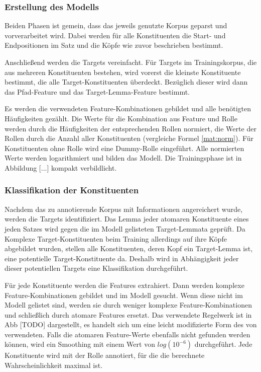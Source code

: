 \documentclass[12pt]{article}
\begin{document}
\subsubsection*{Erstellung des Modells}

Beiden Phasen ist gemein, dass das jeweils genutzte Korpus geparst und vorverarbeitet wird. Dabei werden für alle Konstituenten die Start- und Endpositionen im Satz und die Köpfe wie zuvor beschrieben bestimmt.

Anschließend werden die Targets vereinfacht. Für Targets im Trainingskorpus, die aus mehreren Konstituenten bestehen, wird vorerst die kleinste Konstituente bestimmt, die alle Target-Konstituenten überdeckt. Bezüglich dieser wird dann das Pfad-Feature und das Target-Lemma-Feature bestimmt.

Es werden die verwendeten Feature-Kombinationen gebildet und alle benötigten Häufigkeiten gezählt. Die Werte für die Kombination aus Feature und Rolle werden durch die Häufigkeiten der entsprechenden Rollen normiert, die Werte der Rollen durch die Anzahl aller Konstituenten (vergleiche Formel \eqref{mat:norm}). Für Konstituenten ohne Rolle wird eine Dummy-Rolle eingeführt. Alle normierten Werte werden logarithmiert und bilden das Modell. Die Trainingsphase ist in Abbildung [...] kompakt verbildlicht. 


\subsubsection*{Klassifikation der Konstituenten}\label{subsubsec:classify}
Nachdem das zu annotierende Korpus mit Informationen angereichert wurde, werden die Targets identifiziert. Das Lemma jeder atomaren Konstituente eines jeden Satzes wird gegen die im Modell gelisteten Target-Lemmata geprüft. Da Komplexe Target-Konstituenten beim Training allerdings auf ihre Köpfe abgebildet wurden, stellen alle Konstituenten, deren Kopf ein Target-Lemma ist, eine potentielle Target-Konstituente da. Deshalb wird in Abhängigkeit jeder dieser potentiellen Targets eine Klassifikation durchgeführt.

Für jede Konstituente werden die Features extrahiert. Dann werden komplexe Feature-Kombinationen gebildet und im Modell gesucht. Wenn diese nicht im Modell gelistet sind, werden sie durch weniger komplexe Feature-Kombinationen und schließlich durch atomare Features ersetzt. Das verwendete Regelwerk ist in Abb [TODO] dargestellt, es handelt sich um eine leicht modifizierte Form des von \cite{gildea} verwendeten. Falls die atomaren Feature-Werte ebenfalls nicht gefunden werden können, wird ein Smoothing mit einem Wert von $log(10^{-6})$ durchgeführt. Jede Konstituente wird mit der Rolle annotiert, für die die berechnete Wahrscheinlichkeit maximal ist.
\end{document}
